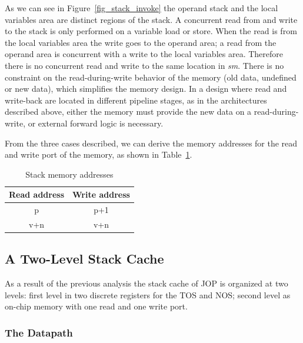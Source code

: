 As we can see in Figure~\ref{fig_stack_invoke} the operand stack and
the local variables area are distinct regions of the stack. A
concurrent read from and write to the stack is only performed on a
variable load or store. When the read is from the local variables
area the write goes to the operand area; a read from the operand
area is concurrent with a write to the local variables area.
Therefore there is no concurrent read and write to the same location
in \textit{sm}. There is no constraint on the read-during-write
behavior of the memory (old data, undefined or new data), which
simplifies the memory design. In a design where read and write-back
are located in different pipeline stages, as in the architectures
described above, either the memory must provide the new data on a
read-during-write, or external forward logic is necessary.

From the three cases described, we can derive the memory addresses
for the read and write port of the memory, as shown in
Table~\ref{tab_stack_address}.

\begin{table}[htbp]
    \centering
    \begin{tabular}{cc}
        \toprule
        Read address&Write address \\
        \midrule p&p+1 \\
        v+n&v+n \\
        \bottomrule
    \end{tabular}
    \caption{Stack memory addresses}
    \label{tab_stack_address}
\end{table}

\subsection{A Two-Level Stack Cache}

As a result of the previous analysis the stack cache of JOP is
organized at two levels: first level in two discrete registers for
the TOS and NOS; second level as on-chip memory with one read and one
write port.

\subsubsection{The Datapath}

